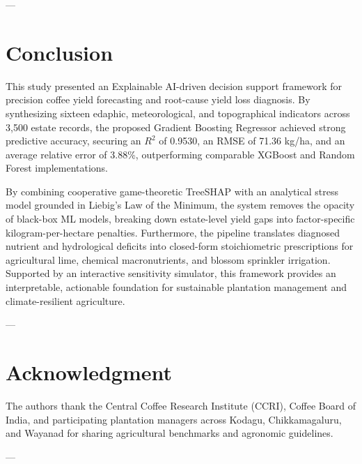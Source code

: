\documentclass[conference]{IEEEtran}
\begin{document}
---

\section{Conclusion}
This study presented an Explainable AI-driven decision support framework for precision coffee yield forecasting and root-cause yield loss diagnosis. By synthesizing sixteen edaphic, meteorological, and topographical indicators across 3,500 estate records, the proposed Gradient Boosting Regressor achieved strong predictive accuracy, securing an $R^2$ of 0.9530, an RMSE of 71.36 kg/ha, and an average relative error of 3.88\%, outperforming comparable XGBoost and Random Forest implementations.

By combining cooperative game-theoretic TreeSHAP with an analytical stress model grounded in Liebig's Law of the Minimum, the system removes the opacity of black-box ML models, breaking down estate-level yield gaps into factor-specific kilogram-per-hectare penalties. Furthermore, the pipeline translates diagnosed nutrient and hydrological deficits into closed-form stoichiometric prescriptions for agricultural lime, chemical macronutrients, and blossom sprinkler irrigation. Supported by an interactive sensitivity simulator, this framework provides an interpretable, actionable foundation for sustainable plantation management and climate-resilient agriculture.

---

\section*{Acknowledgment}
The authors thank the Central Coffee Research Institute (CCRI), Coffee Board of India, and participating plantation managers across Kodagu, Chikkamagaluru, and Wayanad for sharing agricultural benchmarks and agronomic guidelines.

---
\end{document}
